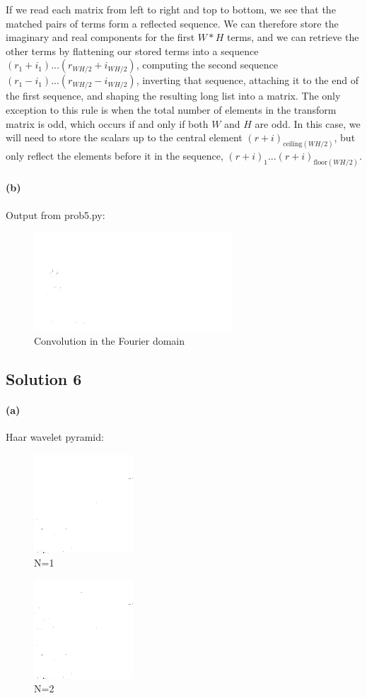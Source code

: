\documentclass{article}
\newcommand{\solution}[1]{\clearpage \subsection*{Solution #1}}
\newcommand{\spart}[1]{\paragraph{(#1)}}
\begin{document}
If we read each matrix from left to right and top to bottom, we see that the matched pairs of terms form a reflected sequence. We can therefore store the imaginary and real components for the first $W*H$ terms, and we can retrieve the other terms by flattening our stored terms into a sequence $(r_1 + i_1) ... (r_{WH/2}+i_{WH/2})$, computing the second sequence $(r_1 - i_1) ... (r_{WH/2}-i_{WH/2})$, inverting that sequence, attaching it to the end of the first sequence, and shaping the resulting long list into a matrix. The only exception to this rule is when the total number of elements in the transform matrix is odd, which occurs if and only if both $W$ and $H$ are odd. In this case, we will need to store the scalars up to the central element $(r+i)_{\text{ceiling}(WH/2)}$, but only reflect the elements before it in the sequence, $(r+i)_{1}...(r+i)_{\text{floor}(WH/2)}$. 

\spart{b} Output from prob5.py:

\begin{figure}[!h]
  \centering
  \includegraphics[height=10em]{code/outputs/prob5.png}
  \caption{Convolution in the Fourier domain}
\end{figure}

\solution{6}

\spart{a} Haar wavelet pyramid:

\begin{figure}[!h]
  \centering
  \includegraphics[height=10em]{code/outputs/prob6a_1.png}
  \caption{N=1}
\end{figure}

\begin{figure}[!h]
  \centering
  \includegraphics[height=10em]{code/outputs/prob6a_2.png}
  \caption{N=2}
\end{figure}
\end{document}
